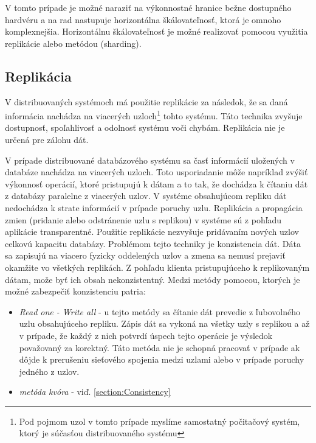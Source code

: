 \documentclass[11pt,twoside,a4paper]{book}
\begin{document}
V tomto prípade je možné naraziť na výkonnostné hranice bežne dostupného hardvéru a na rad nastupuje horizontálna škálovateľnosť, ktorá je omnoho komplexnejšia. Horizontálnu škálovateľnosť je možné realizovať pomocou využitia replikácie alebo metódou  (sharding).

\subsection{Replikácia}

V distribuovaných systémoch má použitie replikácie za následok, že sa daná informácia nachádza na viacerých uzloch\footnote{Pod pojmom uzol v tomto prípade myslíme samostatný počitačový systém, ktorý je súčasťou distribuovaného systému} tohto systému. Táto technika zvyšuje dostupnosť, spoľahlivosť a odolnosť systému voči chybám. Replikácia nie je určená pre zálohu dát. 

V prípade distribuované databázového systému sa časť informácií uložených v databáze nachádza na viacerých uzloch. Toto usporiadanie môže napríklad zvýšiť výkonnosť operácií, ktoré pristupujú k dátam a to tak, že dochádza k čítaniu dát z databázy paralelne z viacerých uzlov. V systéme obsahujúcom repliku dát nedochádza k strate informácií v prípade poruchy uzlu. Replikácia a propagácia zmien (pridanie alebo odstránenie uzlu s replikou) v systéme sú z pohľadu aplikácie transparentné. Použitie replikácie nezvyšuje pridávaním nových uzlov celkovú kapacitu databázy. Problémom tejto techniky je konzistencia dát. Dáta sa zapisujú na viacero fyzicky oddelených uzlov a zmena sa nemusí prejaviť okamžite vo všetkých replikách. Z pohľadu klienta pristupujúceho k replikovaným dátam, može byť ich obsah nekonzistentný. Medzi metódy pomocou, ktorých je možné zabezpečiť konzistenciu patria:
\begin{itemize}
  \item
      \emph{Read one - Write all} - u tejto metódy sa čítanie dát prevedie z ľubovolného uzlu obsahujúceho repliku. Zápis dát sa vykoná na všetky uzly s replikou a až v prípade, že každý z nich potvrdí úspech tejto operácie je výsledok považovaný za korektný. Táto metóda nie je schopná pracovať v prípade ak dôjde k prerušeniu sieťového spojenia medzi uzlami alebo v prípade poruchy jedného z uzlov.
  \item
      \emph{metóda kvóra} - viď. \ref{section:Consistency}

\end{itemize}
\end{document}
